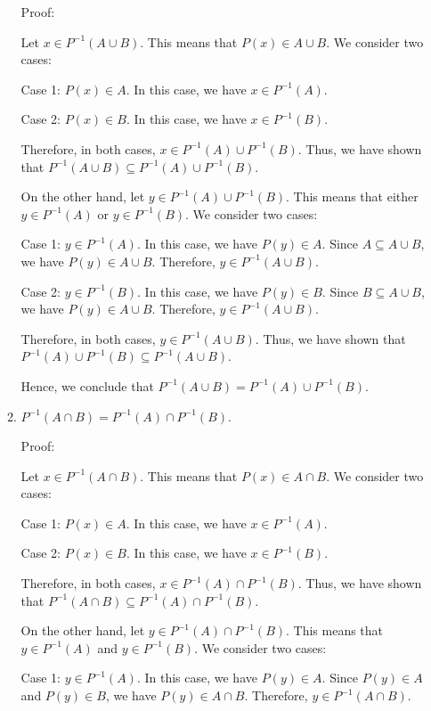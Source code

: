 \documentclass{article}
\begin{document}
\begin{enumerate}
\begin{enumerate}
    Proof:
    
    Let $x \in P^{-1}(A \cup B)$. This means that $P(x) \in A \cup B$. We consider two cases:
    
    Case 1: $P(x) \in A$. In this case, we have $x \in P^{-1}(A)$.
    
    Case 2: $P(x) \in B$. In this case, we have $x \in P^{-1}(B)$.
    
    Therefore, in both cases, $x \in P^{-1}(A) \cup P^{-1}(B)$. Thus, we have shown that $P^{-1}(A \cup B) \subseteq P^{-1}(A) \cup P^{-1}(B)$.
    
    On the other hand, let $y \in P^{-1}(A) \cup P^{-1}(B)$. This means that either $y \in P^{-1}(A)$ or $y \in P^{-1}(B)$. We consider two cases:
    
    Case 1: $y \in P^{-1}(A)$. In this case, we have $P(y) \in A$. Since $A \subseteq A \cup B$, we have $P(y) \in A \cup B$. Therefore, $y \in P^{-1}(A \cup B)$.
    
    Case 2: $y \in P^{-1}(B)$. In this case, we have $P(y) \in B$. Since $B \subseteq A \cup B$, we have $P(y) \in A \cup B$. Therefore, $y \in P^{-1}(A \cup B)$.
    
    Therefore, in both cases, $y \in P^{-1}(A \cup B)$. Thus, we have shown that $P^{-1}(A) \cup P^{-1}(B) \subseteq P^{-1}(A \cup B)$.
    
    Hence, we conclude that $P^{-1}(A \cup B) = P^{-1}(A) \cup P^{-1}(B)$.
    
    \item $P^{-1}(A \cap B) = P^{-1}(A) \cap P^{-1}(B)$.
    
    Proof:
    
    Let $x \in P^{-1}(A \cap B)$. This means that $P(x) \in A \cap B$. We consider two cases:
    
    Case 1: $P(x) \in A$. In this case, we have $x \in P^{-1}(A)$.
    
    Case 2: $P(x) \in B$. In this case, we have $x \in P^{-1}(B)$.
    
    Therefore, in both cases, $x \in P^{-1}(A) \cap P^{-1}(B)$. Thus, we have shown that $P^{-1}(A \cap B) \subseteq P^{-1}(A) \cap P^{-1}(B)$.
    
    On the other hand, let $y \in P^{-1}(A) \cap P^{-1}(B)$. This means that $y \in P^{-1}(A)$ and $y \in P^{-1}(B)$. We consider two cases:
    
    Case 1: $y \in P^{-1}(A)$. In this case, we have $P(y) \in A$. Since $P(y) \in A$ and $P(y) \in B$, we have $P(y) \in A \cap B$. Therefore, $y \in P^{-1}(A \cap B)$.
    

\end{enumerate}
\end{enumerate}
\end{document}
